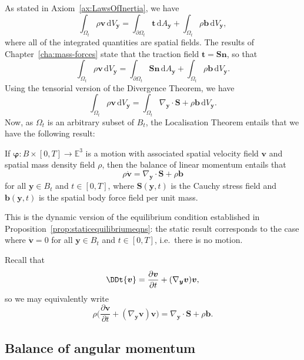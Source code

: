 \documentclass[
  letterpaper,
  DIV=11,
  numbers=noendperiod]{scrreprt}
\theoremstyle{plain}
\theoremstyle{remark}
\begin{document}
As stated in Axiom~\hyperref[ax:LawsOfInertia]{{[}ax:LawsOfInertia{]}},
we have
\[\int_{\Omega_t}\rho{\boldsymbol{v}}{\,{\mathrm{d}}V_{{\boldsymbol{y}}}}=\int_{\partial\Omega_t}{\boldsymbol{t}}{\,{\mathrm{d}}A_{{\boldsymbol{y}}}}+\int_{\Omega_t}\rho{\boldsymbol{b}}{\,{\mathrm{d}}V_{{\boldsymbol{y}}}},\]
where all of the integrated quantities are spatial fields. The results
of Chapter~\hyperref[cha:mass-forces]{{[}cha:mass-forces{]}} state that
the traction field
\({\boldsymbol{t}}={\boldsymbol{S}}{\boldsymbol{n}}\), so that
\[\int_{\Omega_t}\rho{\boldsymbol{v}}{\,{\mathrm{d}}V_{{\boldsymbol{y}}}}=\int_{\partial\Omega_t}{\boldsymbol{S}}{\boldsymbol{n}}{\,{\mathrm{d}}A_{{\boldsymbol{y}}}}+\int_{\Omega_t}\rho{\boldsymbol{b}}{\,{\mathrm{d}}V_{{\boldsymbol{y}}}}.\]
Using the tensorial version of the Divergence Theorem, we have
\[\int_{\Omega_t}\rho{\boldsymbol{v}}{\,{\mathrm{d}}V_{{\boldsymbol{y}}}}=\int_{\Omega_t}\nabla_{\boldsymbol{y}}\cdot{\boldsymbol{S}}+\rho{\boldsymbol{b}}{\,{\mathrm{d}}V_{{\boldsymbol{y}}}}.\]
Now, as \(\Omega_t\) is an arbitrary subset of \(B_t\), the Localisation
Theorem entails that we have the following result:

\label{prop:LinearMomentumEulerian}{} If
\({\boldsymbol{\varphi}}:B\times[0,T]\to{\mathbb{E}}^3\) is a motion
with associated spatial velocity field \({\boldsymbol{v}}\) and spatial
mass density field \(\rho\), then the balance of linear momentum entails
that
\[\rho\dot{\boldsymbol{v}}=\nabla_{\boldsymbol{y}}\cdot{\boldsymbol{S}}+\rho{\boldsymbol{b}}\]
for all \({\boldsymbol{y}}\in B_t\) and \(t\in[0,T]\), where
\({\boldsymbol{S}}({\boldsymbol{y}},t)\) is the Cauchy stress field and
\({\boldsymbol{b}}({\boldsymbol{y}},t)\) is the spatial body force field
per unit mass.

This is the dynamic version of the equilibrium condition established in
Proposition~\hyperref[prop:staticequilibriumeqns]{{[}prop:staticequilibriumeqns{]}}:
the static result corresponds to the case where
\(\dot{\boldsymbol{v}}=0\) for all \({\boldsymbol{y}}\in B_t\) and
\(t\in[0,T]\), i.e.~there is no motion.

Recall that
\[\DDt{{\boldsymbol{v}}} = \frac{\partial{\boldsymbol{v}}}{\partial t} +(\nabla_{\boldsymbol{y}}{\boldsymbol{v}}){\boldsymbol{v}},\]
so we may equivalently write
\[\rho\bigg(\frac{\partial{\boldsymbol{v}}}{\partial t} +(\nabla_{\boldsymbol{y}}{\boldsymbol{v}}){\boldsymbol{v}}\bigg) = \nabla_{\boldsymbol{y}}\cdot{\boldsymbol{S}}+\rho{\boldsymbol{b}}.\]

\subsection{Balance of angular
momentum}\label{balance-of-angular-momentum}
\end{document}

